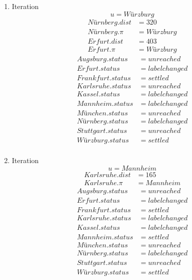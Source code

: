 \documentclass[a4paper]{scrartcl}
\begin{document}
\begin{enumerate}
    \item Iteration
        \begin{equation*}
            u = Würzburg
        \end{equation*}
        \begin{align*}
            Nürnberg.dist &= 320 \\
            Nürnberg.\pi &= Würzburg \\
            Erfurt.dist &= 403 \\
            Erfurt.\pi &= Würzburg
        \end{align*}
        \begin{align*}
            Augsburg.status &= unreached \\
            Erfurt.status &= labelchanged \\
            Frankfurt.status &= settled \\
            Karlsruhe.status &= unreached \\
            Kassel.status &= labelchanged \\
            Mannheim.status &= labelchanged \\
            München.status &= unreached \\
            Nürnberg.status &= labelchanged \\
            Stuttgart.status &= unreached \\
            Würzburg.status &= settled \\
        \end{align*}
        
    \item Iteration
        \begin{equation*}
            u = Mannheim
        \end{equation*}
        \begin{align*}
            Karlsruhe.dist &= 165 \\
            Karlsruhe.\pi &= Mannheim
        \end{align*}
        \begin{align*}
            Augsburg.status &= unreached \\
            Erfurt.status &= labelchanged \\
            Frankfurt.status &= settled \\
            Karlsruhe.status &= labelchanged \\
            Kassel.status &= labelchanged \\
            Mannheim.status &= settled \\
            München.status &= unreached \\
            Nürnberg.status &= labelchanged \\
            Stuttgart.status &= unreached \\
            Würzburg.status &= settled \\
        \end{align*}
        

\end{enumerate}
\end{document}

